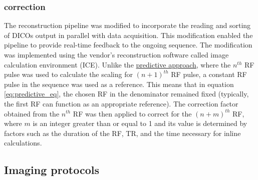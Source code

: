 \subsubsection{ correction}
The reconstruction pipeline was modified to incorporate the reading and sorting of DICOs output in parallel with data acquisition. This modification enabled the pipeline to provide real-time feedback to the ongoing sequence. The modification was implemented using the vendor's reconstruction software called image calculation environment (ICE). Unlike the \hyperlink{subsubsection.2.3.1}{predictive approach}, where the $n^{th}$ RF pulse was used to calculate the scaling for $(n+1)^{th}$ RF pulse, a constant RF pulse in the sequence was used as a reference. This means that in equation \eqref{eq:predictive_eq}, the chosen RF in the denominator remained fixed (typically, the first RF can function as an appropriate reference). The correction factor obtained from the $n^{th}$ RF was then applied to correct for the $(n+m)^{th}$ RF, where $m$ is an integer greater than or equal to 1 and its value is determined by factors such as the duration of the RF, TR, and the time necessary for inline calculations.

\subsection{Imaging protocols}

